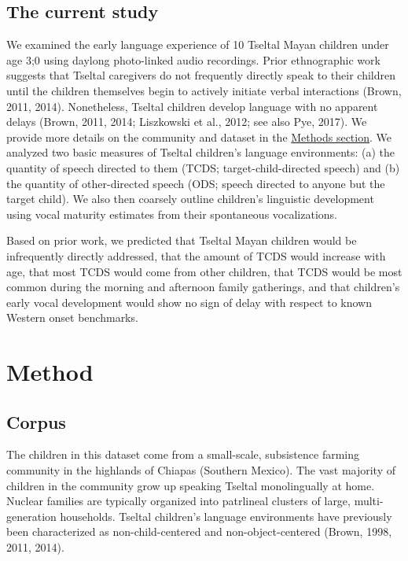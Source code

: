\documentclass[floatsintext,man]{apa6}
\theoremstyle{definition}
\theoremstyle{definition}
\theoremstyle{definition}
\theoremstyle{remark}
\begin{document}
\subsection{The current study}\label{intro-currentstudy}

We examined the early language experience of 10 Tseltal Mayan children
under age 3;0 using daylong photo-linked audio recordings. Prior
ethnographic work suggests that Tseltal caregivers do not frequently
directly speak to their children until the children themselves begin to
actively initiate verbal interactions (Brown, 2011, 2014). Nonetheless,
Tseltal children develop language with no apparent delays (Brown, 2011,
2014; Liszkowski et al., 2012; see also Pye, 2017). We provide more
details on the community and dataset in the
\protect\hyperlink{methods}{Methods section}. We analyzed two basic
measures of Tseltal children's language environments: (a) the quantity
of speech directed to them (TCDS; target-child-directed speech) and (b)
the quantity of other-directed speech (ODS; speech directed to anyone
but the target child). We also then coarsely outline children's
linguistic development using vocal maturity estimates from their
spontaneous vocalizations.

Based on prior work, we predicted that Tseltal Mayan children would be
infrequently directly addressed, that the amount of TCDS would increase
with age, that most TCDS would come from other children, that TCDS would
be most common during the morning and afternoon family gatherings, and
that children's early vocal development would show no sign of delay with
respect to known Western onset benchmarks.

\hypertarget{methods}{\section{Method}\label{methods}}

\subsection{Corpus}\label{methods-dataset}

The children in this dataset come from a small-scale, subsistence
farming community in the highlands of Chiapas (Southern Mexico). The
vast majority of children in the community grow up speaking Tseltal
monolingually at home. Nuclear families are typically organized into
patrlineal clusters of large, multi-generation households. Tseltal
children's language environments have previously been characterized as
non-child-centered and non-object-centered (Brown, 1998, 2011, 2014).
\end{document}
